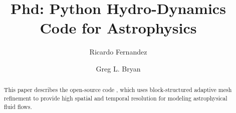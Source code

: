 \documentclass[onecolumn,iop]{emulateapj}  %
\begin{document}
\title{Phd: Python Hydro-Dynamics Code for Astrophysics}
\author{Ricardo Fernandez}
\author{Greg L. Bryan}


\begin{abstract}
This paper describes the open-source code \enzo, which uses
block-structured adaptive mesh refinement to provide high spatial and
temporal resolution for modeling astrophysical fluid flows.
\end{abstract}


\maketitle









%  



  


\end{document}
